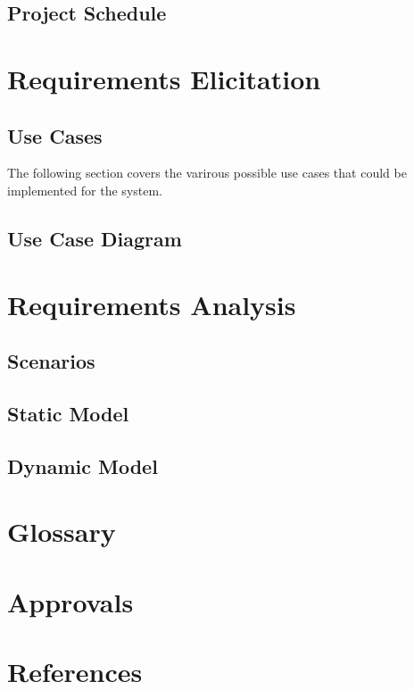 \documentclass[letter,12pt]{report}
\begin{document}
\section{Project Schedule}






\chapter{Requirements Elicitation}

\section{Use Cases}
The following section covers the varirous possible use cases
that could be implemented for the system.

\section{Use Case Diagram}

\chapter{Requirements Analysis}

\section{Scenarios}

\section{Static Model}

\section{Dynamic Model}

\chapter{Glossary}

\chapter{Approvals}

\chapter{References}
\end{document}
